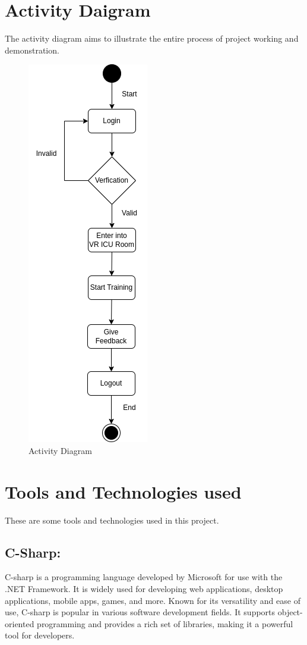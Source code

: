 \section{Activity Daigram}
The activity diagram aims to illustrate the entire process of project working and demonstration.
\begin{figure}[h]
    \centering
    \includegraphics[width=0.25\linewidth]{Images/Activity.drawio.png}
    \caption{Activity Diagram}
\end{figure}
\newpage
\section{Tools and Technologies used}
These are some tools and technologies used in this project.
\subsection{C-Sharp:}
C-sharp is a programming language developed by Microsoft for use with the .NET Framework. It is widely used for developing web applications, desktop applications, mobile apps, games, and more. Known for its versatility and ease of use, C-sharp is popular in various software development fields. It supports object-oriented programming and provides a rich set of libraries, making it a powerful tool for developers.
